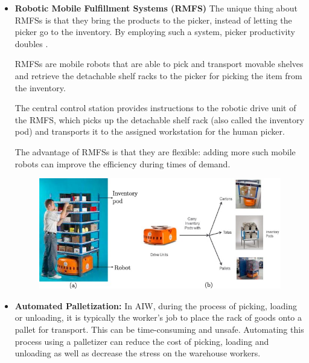 \documentclass{report}
\begin{document}
\begin{itemize}
\begin{figure}[H]
    \end{figure}
    
    \item {\bfseries Robotic Mobile Fulfillment Systems (RMFS)}
    The unique thing about RMFSs is that they bring the products to the picker, instead of letting the picker go to the inventory. By employing such a system, picker productivity doubles \cite{main_paper}.
    
    RMFSs are mobile robots that are able to pick and transport movable shelves and retrieve the detachable shelf racks to the picker for picking the item from the inventory. 
    
    The central control station provides instructions to the robotic drive unit of the RMFS, which picks up the detachable shelf rack (also called the inventory pod) and transports it to the assigned workstation for the human picker.
    
    The advantage of RMFSs is that they are flexible: adding more such mobile robots can improve the efficiency during times of demand.
    
    \begin{figure}[H]
    
    \centering
    \includegraphics[scale=0.6]{rmfs.jpg}
    \caption{}
    
    \end{figure}
    
    \item {\bfseries Automated Palletization:} 
    In AIW, during the process of picking, loading or unloading, it is typically the worker's job to place the rack of goods onto a pallet for transport. This can be time-consuming and unsafe. Automating this process using a palletizer can reduce the cost of picking, loading and unloading as well as decrease the stress on the warehouse workers.
    

\end{itemize}
\end{document}
